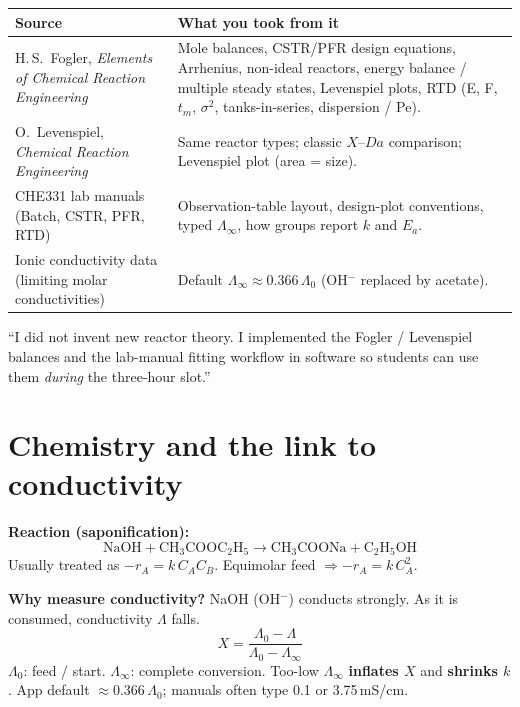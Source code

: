 \documentclass[11pt,a4paper]{article}
\begin{document}
\begin{tabularx}{\textwidth}{@{}l L@{}}
\toprule
\textbf{Source} & \textbf{What you took from it} \\
\midrule
H.\,S.\ Fogler, \emph{Elements of Chemical Reaction Engineering} &
Mole balances, CSTR/PFR design equations, Arrhenius, non-ideal reactors, energy balance / multiple steady states,
Levenspiel plots, RTD (E, F, \(t_m\), \(\sigma^2\), tanks-in-series, dispersion / Pe). \\
O.\ Levenspiel, \emph{Chemical Reaction Engineering} &
Same reactor types; classic \(X\)--\(Da\) comparison; Levenspiel plot (area = size). \\
CHE331 lab manuals (Batch, CSTR, PFR, RTD) &
Observation-table layout, design-plot conventions, typed \(\Lambda_\infty\), how groups report \(k\) and \(E_a\). \\
Ionic conductivity data (limiting molar conductivities) &
Default \(\Lambda_\infty \approx 0.366\,\Lambda_0\) (OH\(^-\) replaced by acetate). \\
\bottomrule
\end{tabularx}

\begin{tipbox}
``I did not invent new reactor theory. I implemented the Fogler / Levenspiel balances and the lab-manual fitting
workflow in software so students can use them \emph{during} the three-hour slot.''
\end{tipbox}

\section{Chemistry and the link to conductivity}

\textbf{Reaction (saponification):}
\[
\mathrm{NaOH + CH_3COOC_2H_5 \rightarrow CH_3COONa + C_2H_5OH}
\]
Usually treated as \(-r_A = k\,C_A C_B\). Equimolar feed \(\Rightarrow -r_A = k\,C_A^2\).

\textbf{Why measure conductivity?} NaOH (OH\(^-\)) conducts strongly. As it is consumed, conductivity \(\Lambda\) falls.
\[
X = \frac{\Lambda_0 - \Lambda}{\Lambda_0 - \Lambda_\infty}
\]
\(\Lambda_0\): feed / start. \(\Lambda_\infty\): complete conversion. Too-low \(\Lambda_\infty\) \textbf{inflates \(X\)} and
\textbf{shrinks \(k\)}. App default \(\approx 0.366\,\Lambda_0\); manuals often type 0.1 or 3.75\,mS/cm.

\end{document}
